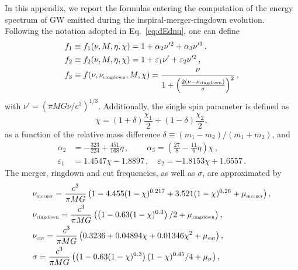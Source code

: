 \documentclass[11pt,a4paper]{article}
\begin{document}
In this appendix, we report the formulas entering the computation of the energy spectrum of GW emitted during the inspiral-merger-ringdown evolution. 
Following the notation adopted in Eq.~\eqref{eq:dEdnu}, one can define
\begin{equation}
\begin{split}
    f_1 & \equiv f_1(\nu, M,\eta,\chi) = 1+\alpha_2\nu'^2 + \alpha_3 \nu'^3 \, , \\  
    f_2 & \equiv f_2(\nu, M,\eta,\chi) = 1 + \varepsilon_1 \nu' + \varepsilon_2 \nu'^2 \, ,\\
    f_3 & \equiv f(\nu, \nu_\text{\tiny ringdown}, M, \chi) = \frac{\nu}{1+\left(\frac{2(\nu-\nu_\text{\tiny ringdown})}{\sigma}\right)^2} \, ,
\end{split}
\end{equation}
with $\nu' = (\pi MG \nu / c^3)^{1/3}$. 
Additionally, the single spin parameter is defined  as 
\begin{equation}
\chi = (1+\delta)\frac{\chi_1}{2}+(1-\delta)\frac{\chi_2}{2},
\end{equation}
as a function of the relative mass difference 
$\delta \equiv (m_1-m_2)/(m_1+m_2)$, and 
\begin{equation}
    \begin{split}
\alpha_2 &= -\frac{323}{224}+\frac{451}{168}\eta \,, 
\qquad \
\alpha_3  = \left( \frac{27}{8} - \frac{11}{6}\eta \right)\chi \, , 
\\
\varepsilon_1 &= 1.4547 \chi - 1.8897 \,,
\quad
\varepsilon_2 = - 1.8153 \chi + 1.6557 \, .
\end{split}
\end{equation}
The merger, ringdown and cut frequencies, as well as $\sigma$, are approximated by
\begin{equation}
\begin{split}
    &\nu_\text{\tiny merger} = \frac{c^3}{\pi M G}  \left(1 - 4.455(1-\chi)^{0.217} + 3.521 (1-\chi)^{0.26} + \mu_\text{\tiny merger} \right) , \\
    &\nu_\text{\tiny ringdown} = \frac{c^3}{\pi M G}  \left(\left(1-0.63(1-\chi)^{0.3}\right)/2 + \mu_\text{\tiny ringdown}\right) ,\\
    &\nu_\text{\tiny cut} = \frac{c^3}{\pi M G}  \left(0.3236 + 0.04894\chi + 0.01346 \chi^2  + \mu_\text{\tiny cut}\right) , \\
    & \sigma = \frac{c^3}{\pi M G} \left( \left(1-0.63(1-\chi)^{0.3}\right)(1-\chi)^{0.45}/4 + \mu_\mathrm{\sigma} \right),
\end{split}
\label{eq:nus}
\end{equation}
\end{document}

